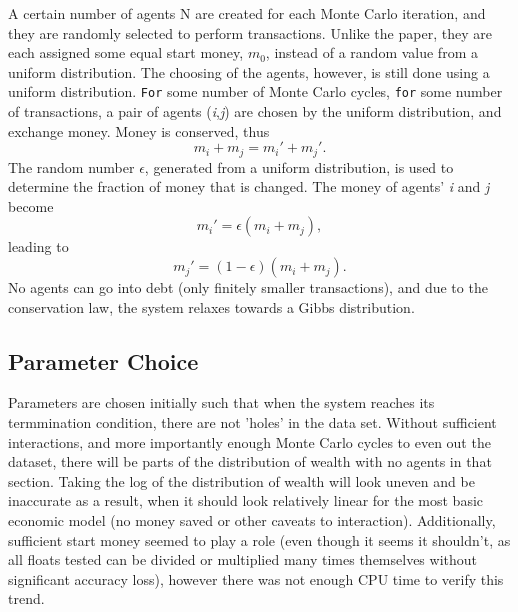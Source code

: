 \documentclass[12pt]{article} %
\begin{document}
A certain number of agents N are created for each Monte Carlo iteration, and
they are randomly selected to perform transactions. Unlike the paper, they are
each assigned some equal start money, \textit{$m_0$}, instead of a random value
from a uniform distribution. The choosing of the agents, however, is still done
using a uniform distribution. \texttt{For} some number of Monte Carlo cycles,
\texttt{for} some number of transactions, a pair of agents
(\textit{i},\textit{j}) are chosen by the uniform distribution, and exchange
money. Money is conserved, thus
\begin{equation}
  m_i+m_j=m_i'+m_j'.
  \label{eq:conserve}
\end{equation}
The random number $\epsilon$, generated from a uniform distribution, is used to
determine the fraction of money that is changed. The money of agents'
\textit{i} and \textit{j} become
\begin{equation*}
m_i' = \epsilon(m_i+m_j),
\end{equation*}
leading to
\begin{equation*}
m_j'= (1-\epsilon)(m_i+m_j).
\end{equation*}
No agents can go into debt (only finitely smaller transactions), and due to the
conservation law, the system relaxes towards a Gibbs distribution.

\subsection{Parameter Choice}
Parameters are chosen initially such that when the system reaches its
termmination condition, there are not 'holes' in the data set. Without
sufficient interactions, and more importantly enough Monte Carlo cycles to even
out the dataset, there will be parts of the distribution of wealth with no
agents in that section. Taking the log of the distribution of wealth will look
uneven and be inaccurate as a result, when it should look relatively linear for
the most basic economic model (no money saved or other caveats to interaction).
Additionally, sufficient start money seemed to play a role (even though it
seems it shouldn't, as all floats tested can be divided or multiplied many
times themselves without significant accuracy loss), however there was not
enough CPU time to verify this trend.
\end{document}
